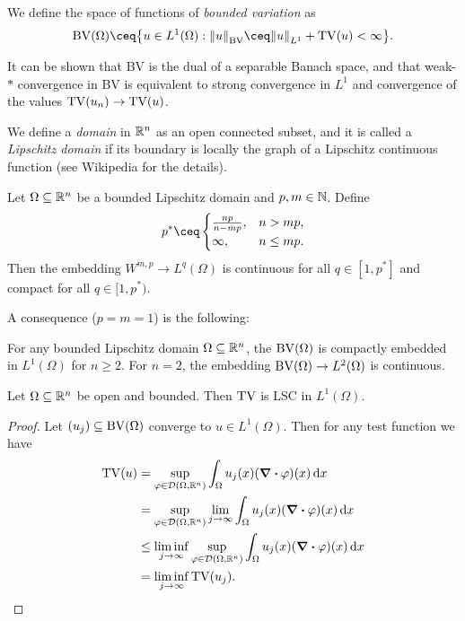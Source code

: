 \begin{definition}
	We define the space of functions of \emph{bounded variation} as
	\[
	\BV(\Omega) \ceq \qty{u \in L^1(\Omega) : \norm{u}_{\BV} \ceq \norm{u}_{L^1} + \TV(u) < \infty}.
	\]
\end{definition}
\begin{remark}
	It can be shown that BV is the dual of a separable Banach space, and that weak-$*$ convergence in BV is equivalent to strong convergence in $L^1$ and convergence of the values $\operatorname{TV}(u_n) \to \operatorname{TV}(u)$. 
\end{remark}

\begin{definition}
	We define a \emph{domain} in $\mathbb R^n$ as an open connected subset, and it is called a \emph{Lipschitz domain} if its boundary is locally the graph of a Lipschitz continuous function (see Wikipedia for the details). 
\end{definition}

\begin{theorem}
	Let $\Omega \subseteq \mathbb R^n$ be a bounded Lipschitz domain and $p, m \in \mathbb N$. Define 
	\[
	p^* \ceq \begin{cases} \frac{np}{n - mp}, &n > mp, \\ \infty,& n \leq mp. \end{cases}
	\]
	Then the embedding $W^{m, p} \to L^q(\Omega)$ is continuous for all $q \in [1, p^*]$ and compact for all $q \in [1, p^*)$. 
\end{theorem}

A consequence ($p = m = 1$) is the following:
\begin{corollary}
	For any bounded Lipschitz domain $\Omega \subseteq \mathbb R^n$, the $\operatorname{BV}(\Omega)$ is compactly embedded in $L^1(\Omega)$ for $n \geq 2$. For $n = 2$, the embedding $\operatorname{BV}(\Omega) \to L^2(\Omega)$ is continuous. 
\end{corollary}

\begin{theorem}
	Let $\Omega \subseteq \mathbb R^n$ be open and bounded. Then $\operatorname{TV}$ is LSC in $L^1(\Omega)$. 
\end{theorem}

\begin{proof}
	Let $(u_j) \subseteq \operatorname{BV}(\Omega)$ converge to $u \in L^1(\Omega)$. Then for any test function we have
	\begin{align*}
		\operatorname{TV}(u) &= \sup_{\varphi \in \mathcal D(\Omega, \mathbb R^n)}\int_\Omega u_j(x) (\div \varphi)(x) \dd{x} \\
		&= \sup_{\varphi \in \mathcal D(\Omega, \mathbb R^n)} \lim_{j\to\infty} \int_\Omega u_j(x) (\div \varphi)(x) \dd{x} \\
		&\leq \liminf_{j\to\infty} \sup_{\varphi \in \mathcal D(\Omega, \mathbb R^n)} \int_\Omega u_j(x) (\div\varphi)(x) \dd{x} \\
		&= \liminf_{j\to\infty} \operatorname{TV}(u_j). 
	\end{align*}
\end{proof}

